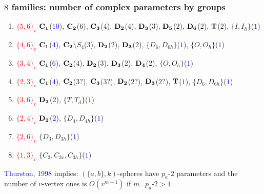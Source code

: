 \documentclass{beamer}
\begin{document}
\begin{frame}
\frametitle{$8$ families: number of complex parameters by groups}
\vspace{-1.5mm}

\begin{enumerate}
\item[\ding{108}]  \textcolor{red}{$\{5,6\}_v$}
${\bf C_1}$(\textcolor{blue}{{\bf $10$}}),  ${\bf C_2}$($6$), ${\bf C_3}$($4$),  ${\bf D_2}$($4$),  
${\bf D_3}$($3$), ${\bf
D_5}$($2$),  ${\bf D_6}$($2$), ${\bf T}$($2$),  $\{I,I_h\}$(\textcolor{blue}{{\bf $1$}})
\item[\ding{108}]    \textcolor{red}{$\{4,6\}_v$} ${\bf C_1}$(\textcolor{blue}{{\bf $4$}}),
${\bf C_2}$$\setminus$$ S_{4}$($3$), ${\bf D_2}$($2$), ${\bf D_3}$($2$),  $\{D_6,D_{6h}\}$(\textcolor{blue}{{\bf $1$}}), 
$\{O,O_h\}$(\textcolor{blue}{{\bf $1$}})
\item[\ding{108}]  \textcolor{red}{$\{3, 4\}_v$} ${\bf C_{1}}$(\textcolor{blue}{{\bf $6$}}),
${\bf C_2}$($4$),  ${\bf D_2}$($3$),
${\bf D_3}$($2$), ${\bf D_4}$($2$), $\{O,O_h\}$(\textcolor{blue}{{\bf $1$}})
\item[\ding{108}]    \textcolor{red}{$\{2, 3\}_v$}  
${\bf C_1}$(\textcolor{blue}{{\bf $4$}}),
${\bf C_2}$($3?$), ${\bf C_3}$($3?$), ${\bf D_2}$($2?$), ${\bf 
D_3}$($2?$), ${\bf T}$(\textcolor{blue}{{\bf $1$}}),  
$\{D_6,D_{6h}\}$(\textcolor{blue}{{\bf $1$}})

\item[\ding{108}]   \textcolor{red}{$\{3,6\}_v$} ${\bf D_{2}}$($2$),
$\{T,T_d\}$(\textcolor{blue}{{\bf $1$}})
\item[\ding{108}]   \textcolor{red}{$\{2, 4\}_v$} ${\bf D_2}$(\textcolor{blue}{{\bf $2$}}),
$\{D_4,D_{4h}\}$(\textcolor{blue}{{\bf $1$}})

\item[\ding{108}]  \textcolor{red}{$\{2, 6\}_v$} $\{D_3,D_{3h}\}$(\textcolor{blue}{{\bf $1$}})
\item[\ding{108}]  \textcolor{red}{$\{1, 3\}_v$} 
$\{C_{3},C_{3v},C_{3h}\}$(\textcolor{blue}{{\bf $1$}})

\end{enumerate}
\textcolor{blue}{Thurston, 1998} implies: $(\{a,b\},k)$-spheres 
 have $p_{a}$-$2$ parameters and the number of $ v$-vertex ones is 
$O(v^{m-1})$ if $m$=$p_a$-$2>1$.

\end{frame}
\end{document}
